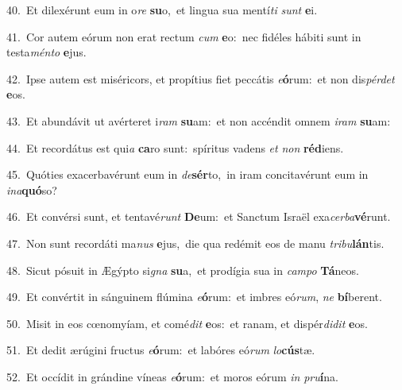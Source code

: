 {\numbfont\textcolor{\numbcolor}{40.}}~Et dilexérunt eum in o\textit{re} \textbf{su}\-o,~\star et lingua sua mentí\textit{ti} \textit{sunt} \textbf{e}\-i.\par
{\numbfont\textcolor{\numbcolor}{41.}}~Cor autem eórum non erat rectum \textit{cum} \textbf{e}\-o:~\star nec fidéles hábiti sunt in testa\-\textit{mén}\-\textit{to} \textbf{e}\-jus.\par
{\numbfont\textcolor{\numbcolor}{42.}}~Ipse autem est miséricors, et propítius fiet peccátis \textit{e}\-\textbf{ó}rum:~\star et non dis\-\textit{pér}\-\textit{det} \textbf{e}\-os.\par
{\numbfont\textcolor{\numbcolor}{43.}}~Et abundávit ut avérteret i\textit{ram} \textbf{su}\-am:~\star et non accéndit omnem \textit{i}\-\textit{ram} \textbf{su}\-am:\par
{\numbfont\textcolor{\numbcolor}{44.}}~Et recordátus est qui\textit{a} \textbf{ca}\-ro sunt:~\star spíritus vadens \textit{et} \textit{non} \textbf{réd}\-iens.\par
{\numbfont\textcolor{\numbcolor}{45.}}~Quóties exacerbavérunt eum in \textit{de}\-\textbf{sér}to,~\star in iram concitavérunt eum in \textit{in}\-\textit{a}\textbf{quó}so?\par
{\numbfont\textcolor{\numbcolor}{46.}}~Et convérsi sunt, et tentavé\textit{runt} \textbf{De}\-um:~\star et Sanctum Israël exa\-\textit{cer}\-\textit{ba}\textbf{vé}runt.\par
{\numbfont\textcolor{\numbcolor}{47.}}~Non sunt recordáti ma\textit{nus} \textbf{e}\-jus,~\star die qua redémit eos de manu \textit{tri}\-\textit{bu}\textbf{lán}tis.\par
{\numbfont\textcolor{\numbcolor}{48.}}~Sicut pósuit in Ægýpto si\textit{gna} \textbf{su}\-a,~\star et prodígia sua in \textit{cam}\-\textit{po} \textbf{Tá}\-neos.\par
{\numbfont\textcolor{\numbcolor}{49.}}~Et convértit in sánguinem flúmina \textit{e}\-\textbf{ó}rum:~\star et imbres eó\-\textit{rum}\-, \textit{ne} \textbf{bí}\-berent.\par
{\numbfont\textcolor{\numbcolor}{50.}}~Misit in eos cœnomyíam, et comé\textit{dit} \textbf{e}\-os:~\star et ranam, et dispér\-\textit{di}\-\textit{dit} \textbf{e}\-os.\par
{\numbfont\textcolor{\numbcolor}{51.}}~Et dedit ærúgini fructus \textit{e}\-\textbf{ó}rum:~\star et labóres eó\textit{rum} \textit{lo}\-\textbf{cús}tæ.\par
{\numbfont\textcolor{\numbcolor}{52.}}~Et occídit in grándine víneas \textit{e}\-\textbf{ó}rum:~\star et moros eórum \textit{in} \textit{pru}\-\textbf{í}na.\par
